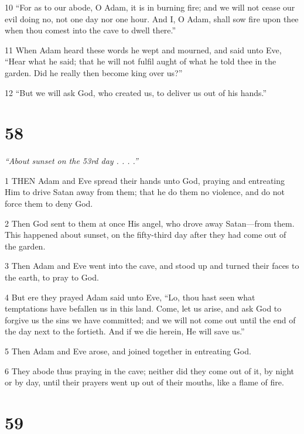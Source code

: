 \par 10 “For as to our abode, O Adam, it is in burning fire; and we will not cease our evil doing no, not one day nor one hour. And I, O Adam, shall sow fire upon thee when thou comest into the cave to dwell there.”

\par 11 When Adam heard these words he wept and mourned, and said unto Eve, “Hear what he said; that he will not fulfil aught of what he told thee in the garden. Did he really then become king over us?”

\par 12 “But we will ask God, who created us, to deliver us out of his hands.”

\chapter{58}

\par \textit{“About sunset on the 53rd day . . . .”}

\par 1 THEN Adam and Eve spread their hands unto God, praying and entreating Him to drive Satan away from them; that he do them no violence, and do not force them to deny God.

\par 2 Then God sent to them at once His angel, who drove away Satan—from them. This happened about sunset, on the fifty-third day after they had come out of the garden.

\par 3 Then Adam and Eve went into the cave, and stood up and turned their faces to the earth, to pray to God.

\par 4 But ere they prayed Adam said unto Eve, “Lo, thou hast seen what temptations have befallen us in this land. Come, let us arise, and ask God to forgive us the sins we have committed; and we will not come out until the end of the day next to the fortieth. And if we die herein, He will save us.”

\par 5 Then Adam and Eve arose, and joined together in entreating God.

\par 6 They abode thus praying in the cave; neither did they come out of it, by night or by day, until their prayers went up out of their mouths, like a flame of fire.

\chapter{59}

